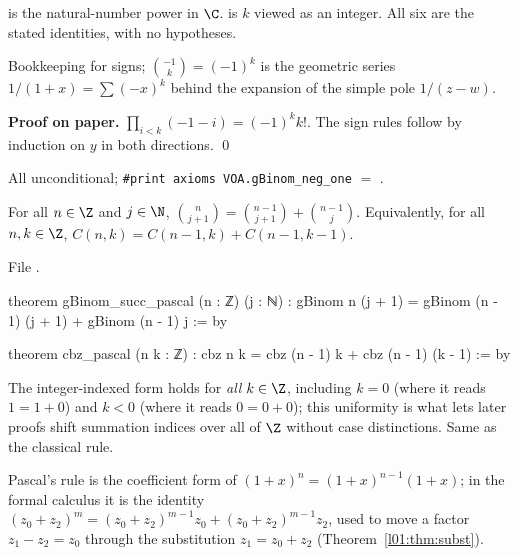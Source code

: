 \begin{dictionary}
 is the natural-number power in $\C$.  is $k$ viewed as an integer. All six
are the stated identities, with no hypotheses.
\end{dictionary}

\begin{physics}
Bookkeeping for signs; $\binom{-1}{k} = (-1)^k$ is the geometric series $1/(1+x) = \sum(-x)^k$ behind the
expansion of the simple pole $1/(z-w)$.
\end{physics}

\textbf{Proof on paper.} $\prod_{i<k}(-1-i) = (-1)^k k!$. The sign rules follow by induction on $y$ in
both directions. \qed

\begin{status}
All unconditional; \texttt{\#print axioms VOA.gBinom\_neg\_one} $=$
.
\end{status}

\begin{proposition}\label{l01:prop:pascal}
For all $n\in\Z$ and $j\in\N$, $\binom n{j+1} = \binom{n-1}{j+1}+\binom{n-1}{j}$. Equivalently, for all
$n,k\in\Z$, $C(n,k) = C(n-1,k)+C(n-1,k-1)$.
\end{proposition}

\noindent File .
\begin{leancode}
theorem gBinom_succ_pascal (n : ℤ) (j : ℕ) :
    gBinom n (j + 1) = gBinom (n - 1) (j + 1) + gBinom (n - 1) j := by

theorem cbz_pascal (n k : ℤ) : cbz n k = cbz (n - 1) k + cbz (n - 1) (k - 1) := by
\end{leancode}

\begin{dictionary}
The integer-indexed form  holds for \emph{all} $k\in\Z$, including $k = 0$ (where it
reads $1 = 1+0$) and $k<0$ (where it reads $0 = 0+0$); this uniformity is what lets later proofs shift
summation indices over all of $\Z$ without case distinctions. Same as the classical rule.
\end{dictionary}

\begin{physics}
Pascal's rule is the coefficient form of $(1+x)^n = (1+x)^{n-1}(1+x)$; in the formal calculus it is the
identity $(z_0+z_2)^{m} = (z_0+z_2)^{m-1}z_0 + (z_0+z_2)^{m-1}z_2$, used to move a factor
$z_1-z_2 = z_0$ through the substitution $z_1 = z_0+z_2$ (Theorem~\ref{l01:thm:subst}).
\end{physics}

